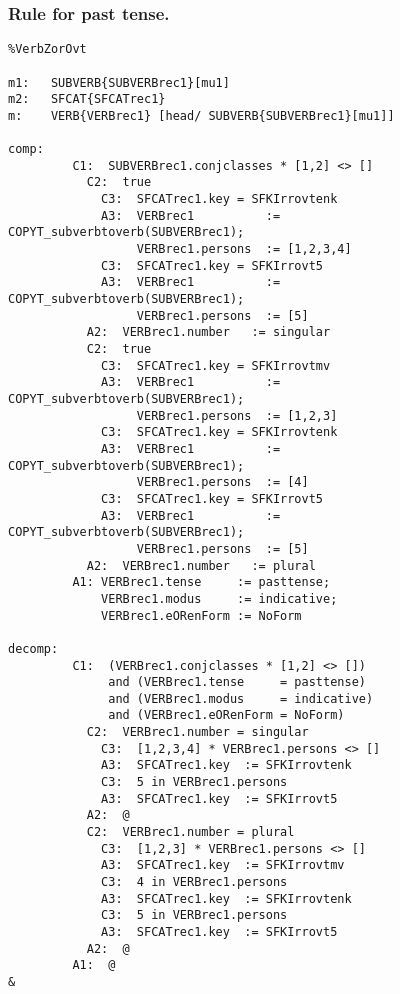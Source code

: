 \subsubsection{Rule for past tense.}
\begin{verbatim}
%VerbZorOvt

m1:   SUBVERB{SUBVERBrec1}[mu1]
m2:   SFCAT{SFCATrec1}
m:    VERB{VERBrec1} [head/ SUBVERB{SUBVERBrec1}[mu1]]

comp:
         C1:  SUBVERBrec1.conjclasses * [1,2] <> []
           C2:  true
             C3:  SFCATrec1.key = SFKIrrovtenk
             A3:  VERBrec1          := COPYT_subverbtoverb(SUBVERBrec1);
                  VERBrec1.persons  := [1,2,3,4]
             C3:  SFCATrec1.key = SFKIrrovt5
             A3:  VERBrec1          := COPYT_subverbtoverb(SUBVERBrec1);
                  VERBrec1.persons  := [5]
           A2:  VERBrec1.number   := singular
           C2:  true
             C3:  SFCATrec1.key = SFKIrrovtmv
             A3:  VERBrec1          := COPYT_subverbtoverb(SUBVERBrec1);
                  VERBrec1.persons  := [1,2,3]
             C3:  SFCATrec1.key = SFKIrrovtenk
             A3:  VERBrec1          := COPYT_subverbtoverb(SUBVERBrec1);
                  VERBrec1.persons  := [4]
             C3:  SFCATrec1.key = SFKIrrovt5
             A3:  VERBrec1          := COPYT_subverbtoverb(SUBVERBrec1);
                  VERBrec1.persons  := [5]
           A2:  VERBrec1.number   := plural
         A1: VERBrec1.tense     := pasttense;
             VERBrec1.modus     := indicative;
             VERBrec1.eORenForm := NoForm

decomp:
         C1:  (VERBrec1.conjclasses * [1,2] <> [])
              and (VERBrec1.tense     = pasttense) 
              and (VERBrec1.modus     = indicative)
              and (VERBrec1.eORenForm = NoForm)
           C2:  VERBrec1.number = singular
             C3:  [1,2,3,4] * VERBrec1.persons <> []
             A3:  SFCATrec1.key  := SFKIrrovtenk
             C3:  5 in VERBrec1.persons 
             A3:  SFCATrec1.key  := SFKIrrovt5
           A2:  @
           C2:  VERBrec1.number = plural
             C3:  [1,2,3] * VERBrec1.persons <> []
             A3:  SFCATrec1.key  := SFKIrrovtmv
             C3:  4 in VERBrec1.persons 
             A3:  SFCATrec1.key  := SFKIrrovtenk
             C3:  5 in VERBrec1.persons 
             A3:  SFCATrec1.key  := SFKIrrovt5
           A2:  @
         A1:  @
&
\end{verbatim}
\newpage
